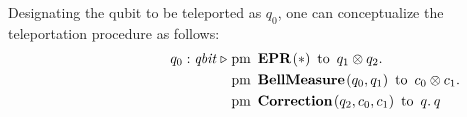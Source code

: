  Designating the qubit to be teleported as $q_0$, one can conceptualize the teleportation procedure as follows:
 \begin{align*}
    \hspace{80 pt} q_{0}: \textit{qbit}\hspace{3 pt} \triangleright \hspace{3 pt} & \text{pm} \hspace{5pt} \textbf{EPR}\hspace{1pt} (*) \hspace{5pt} \text{to} \hspace{5pt}  q_{1} \otimes q_{2}.  \notag \\
     & \text{pm}\hspace{5pt} \textbf{BellMeasure} \hspace{1pt} (q_0,q_{1}) \hspace{5pt}  \text{to} \hspace{5pt} c_{0}\otimes c_{1} . \notag \\
     & \text{pm} \hspace{5pt}  \textbf{Correction} \hspace{1pt} ( q_{2},  c_{0}, c_{1} ) \hspace{5pt} \text{to} \hspace{5pt}  q. \hspace{2pt}  q
 \end{align*}
 

